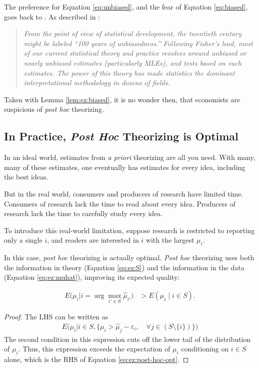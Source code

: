 \documentclass[12pt,english]{article}
\theoremstyle{plain}
\theoremstyle{plain}
\begin{document}
The preference for Equation \eqref{eq:unbiased}, and the fear of Equation \eqref{eq:biased}, goes back to \citet{fisher1925statistical}. As described in \citet{efron2001statistical}:
\begin{quote}
    \emph{From the point of view of statistical development, the twentieth century might be labeled ``100 years of unbiasedness.'' Following Fisher's lead, most of our current statistical theory and practice revolves around unbiased or nearly unbiased estimates (particularly MLEs), and tests based on such estimates. The power of this theory has made statistics the dominant interpretational methodology in dozens of fields.}
\end{quote}
Taken with Lemma \ref{lem:ez:biased}, it is no wonder then, that economists are suspicious of \emph{post hoc} theorizing.

\subsection{In Practice, \emph{Post Hoc} Theorizing is Optimal}\label{sec:ez:practical}

In an ideal world, estimates from \emph{a priori} theorizing are all you need. With many, many of these estimates, one  eventually has estimates for every idea, including the best ideas.

But in the real world, consumers and producers of research have limited time. Consumers of research lack the time to read about every idea. Producers of research lack the time to carefully study every idea.

To introduce this real-world limitation, suppose research is restricted to reporting only a single $i$, and readers are interested in $i$ with the largest $\mu_{i}$. 

In this case, \emph{post hoc} theorizing is actually optimal. \emph{Post hoc} theorizing uses both the information in theory (Equation \eqref{eq:ez:S}) and the information in the data (Equation \eqref{eq:ez:muhat}), improving its expected quality:
\begin{lemma}\label{lem:ez:post-hoc-opt}
    \begin{align}
        E\bigg(\mu_{i}\big|i=\arg\max_{i'\in S }\hat{\mu}_{i'}\bigg) & >E\left(\mu_{i}\mid i\in S \right).
        \label{eq:ez:post-hoc-opt}
    \end{align}            
\end{lemma} 
\begin{proof}
    The LHS can be written as 
    \begin{align*}
        E\bigg(\mu_i
        \big|
        i \in S,
        \{
         \mu_i 
        > \hat{\mu}_j - \varepsilon_i
        , \quad
         \forall j \in \left( S\setminus\{i\}
         \right)
         \}
         \bigg)
    \end{align*}
The second condition in this expression cuts off the lower tail of the distribution of $\mu_i$. Thus, this expression exceeds the expectation of $\mu_i$ conditioning on $i\in S$ alone, which is the RHS of Equation \eqref{eq:ez:post-hoc-opt}.
\end{proof}
\end{document}
